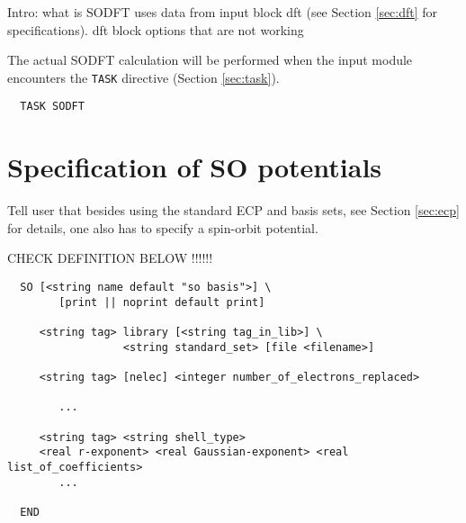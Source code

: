 \label{sec:sodft}



Intro: what is SODFT
       uses data from input block dft (see Section \ref{sec:dft} for specifications).
       dft block options that are not working

 

The actual SODFT calculation will be performed when the input module
encounters the \verb+TASK+ directive (Section \ref{sec:task}).  
\begin{verbatim}
  TASK SODFT
\end{verbatim}

\section{Specification of SO potentials}

Tell user that besides using the standard ECP and basis sets, see Section \ref{sec:ecp} 
for details, one also has to specify a spin-orbit potential.

CHECK DEFINITION BELOW !!!!!!

\begin{verbatim}
  SO [<string name default "so basis">] \
        [print || noprint default print]

     <string tag> library [<string tag_in_lib>] \
                  <string standard_set> [file <filename>]

     <string tag> [nelec] <integer number_of_electrons_replaced>

        ...

     <string tag> <string shell_type>
     <real r-exponent> <real Gaussian-exponent> <real list_of_coefficients>
        ...

  END
\end{verbatim}

